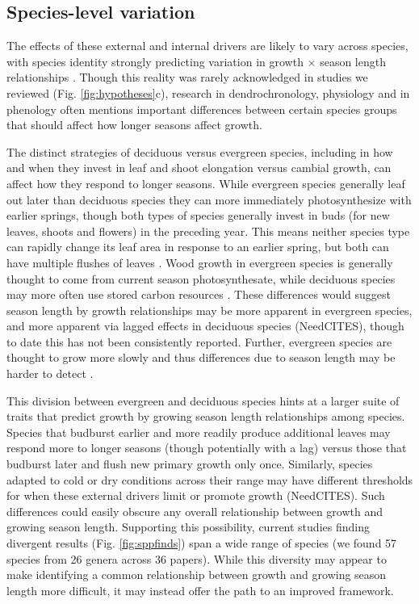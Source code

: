 \documentclass[11pt]{article}
\begin{document}
\subsection*{Species-level variation}
The effects of these external and internal drivers are likely to vary across species, with species identity strongly predicting variation in growth $\times$ season length relationships \citep[e.g.][]{cuny2012life,michelot2012comparing}. Though this reality was rarely acknowledged in studies we reviewed (Fig. \ref{fig:hypotheses}c), research in dendrochronology, physiology and in phenology often mentions important differences between certain species groups that should affect how longer seasons affect growth. 

The distinct strategies of deciduous versus evergreen species, including in how and when they invest in leaf and shoot elongation versus cambial growth, can affect how they respond to longer seasons. While evergreen species generally leaf out later than deciduous species they can more immediately photosynthesize with earlier springs, though both types of species generally invest in buds (for new leaves, shoots and flowers) in the preceding year. This means neither species type can rapidly change its leaf area in response to an earlier spring, but both can have multiple flushes of leaves \citep{day2011regulation,soolanayakanahally2013timing}. Wood growth in evergreen species is generally thought to come from current season photosynthesate, while deciduous species may more often use stored carbon resources \citep{gordon1968seasonal,monson2018finding}. These differences would suggest season length by growth relationships may be more apparent in evergreen species, and more apparent via lagged effects in deciduous species (NeedCITES), though to date this has not been consistently reported. Further, evergreen species are thought to grow more slowly and thus differences due to season length may be harder to detect \citep{waring1979evergreen}.  %

This division between evergreen and deciduous species hints at a larger suite of traits that predict growth by growing season length relationships among species. Species that budburst earlier and more readily produce additional leaves \citep[e.g., lammas growth and other characteristics of `indeterminate' species,][]{kikuzawa1982leaf,Lechowicz:1984cr} may respond more to longer seasons (though potentially with a lag) versus those that budburst later and flush new primary growth only once. Similarly, species adapted to cold or dry conditions across their range may have different thresholds for when these external drivers limit or promote growth (NeedCITES). Such differences could easily obscure any overall relationship between growth and growing season length. Supporting this possibility, current studies finding divergent results (Fig. \ref{fig:sppfinds}) span a wide range of species (we found  57 species from 26 genera across 36 papers). While this diversity may appear to make identifying a common relationship between growth and growing season length more difficult, it may instead offer the path to an improved framework. 
\end{document}
